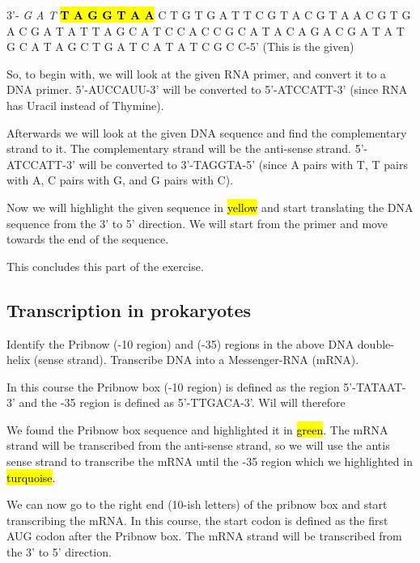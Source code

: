 \vspace{1em}

3’- \textit{G A T} \hl{\textbf{T A G G T A A}} C T G T G A T T C G T A C G T A A C G T G A C G A T A T T A G C A T C C A C C G C A T A C A G A C G A T A T G C A T A G C T G A T C A T A T C G C C-5’      (This is the given)

\vspace{1em}

So, to begin with, we will look at the given RNA primer, and convert it to a DNA primer.
5'-AUCCAUU-3' will be converted to 5'-ATCCATT-3' (since RNA has Uracil instead of Thymine). 


Afterwards we will look at the given DNA sequence and find the complementary strand to it. The complementary strand will be the anti-sense strand. 5'-ATCCATT-3' will be converted to 3'-TAGGTA-5' (since A pairs with T, T pairs with A, C pairs with G, and G pairs with C).


Now we will highlight the given sequence in \hl{yellow} and start translating the DNA sequence from the 3' to 5' direction. We will start from the primer and move towards the end of the sequence.

\vspace{1em}
This concludes this part of the exercise.

\subsection{Transcription in prokaryotes}
Identify the Pribnow (-10 region) and (-35) regions in the above DNA double-helix (sense strand). Transcribe DNA into a Messenger-RNA (mRNA).

\vspace{1em}
In this course the Pribnow box (-10 region) is defined as the region 5’-TATAAT-3’ and the -35 region is defined as 5’-TTGACA-3’. Wil will therefore 

We found the Pribnow box sequence and highlighted it in \hl{green}. The mRNA strand will be transcribed from the anti-sense strand, so we will use the antis sense strand to transcribe the mRNA until the -35 region which we highlighted in \hl{turquoise}.


We can now go to the right end (10-ish letters) of the pribnow box and start transcribing the mRNA. In this course, the start codon is defined as the first AUG codon after the Pribnow box. The mRNA strand will be transcribed from the 3' to 5' direction.

